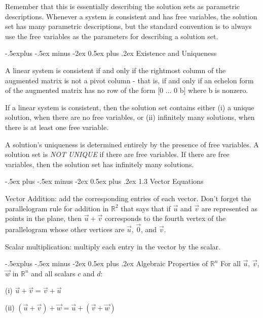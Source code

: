 \documentclass[10pt,landscape]{article}
\makeatletter
\renewcommand{\section}{\@startsection{section}{1}{0mm}%
                                {-.5ex plus -.5ex minus -2ex}%
                                {0.5ex plus .2ex}%
                                {\normalfont\footnotesize\bfseries}}
\renewcommand{\subsection}{\@startsection{subsection}{2}{0mm}%
                                {-.5explus -.5ex minus -2ex}%
                                {0.5ex plus .2ex}%
                                {\normalfont\footnotesize\bfseries}}
\makeatother
\begin{document}
\begin{multicols}{4}
Remember that this is essentially describing the solution sets as parametric descriptions. Whenever a system is consistent and has free variables, the solution set has many parametric descriptions, but the standard convention is to always use the free variables as the parameters for describing a solution set. 

\subsection{Existence and Uniqueness}

A linear system is consistent if and only if the rightmost column of the augmented matrix is not a pivot column - that is, if and only if an echelon form of the augmented matrix has no row of the form [0 ... 0 b] where b is nonzero.  

If a linear system is consistent, then the solution set contains either (i) a unique solution, when there are no free variables, or (ii) infinitely many solutions, when there is at least one free variable.

A solution's uniqueness is determined entirely by the presence of free variables. A solution set is \textit{NOT UNIQUE} if there are free variables. If there are free variables, then the solution set has infinitely many solutions. 


\section{1.3 Vector Equations}

Vector Addition: add the corresponding entries of each vector.  Don't forget the parallelogram rule for addition in $\mathbb{R}^2$ that says that if $\vec{u}$ and $\vec{v}$ are represented as points in the plane, then $\vec{u} + \vec{v}$ corresponds to the fourth vertex of the parallelogram whose other vertices are $\vec{u}$, $\vec{0}$, and $\vec{v}$. 

Scalar multiplication: multiply each entry in the vector by the scalar.

\subsection{Algebraic Properties of $\mathbb{R}^n$}
For all $\vec{u}$, $\vec{v}$, $\vec{w}$ in $\mathbb{R}^n$ and all scalars $\textit{c}$ and $\textit{d}$:

(i) $\vec{u} + \vec{v} = \vec{v} + \vec{u}$

(ii) $(\vec{u} + \vec{v}) + \vec{w} = \vec{u} + (\vec{v} + \vec{w})$


\end{multicols}
\end{document}
